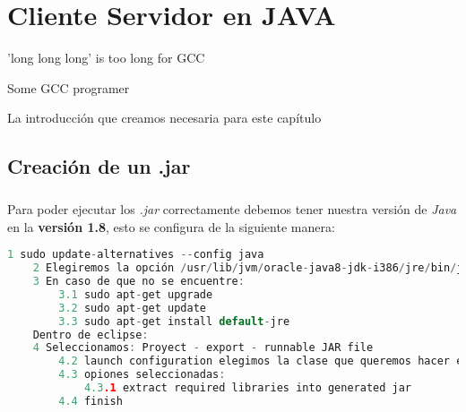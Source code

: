 \newpage

\thispagestyle{empty}
\mbox{}

\chapter{Cliente Servidor en JAVA}

\label{ch:capitulo6.tex}

\begin{FraseCelebre}
	\begin{Frase}
		'long long long' is too long for GCC
	\end{Frase}
	\begin{Fuente}
	Some GCC programer
	\end{Fuente}
\end{FraseCelebre}

La introducción que creamos necesaria para este capítulo

\section{Creación de un .jar}
\label{makereference6.2}
\paragraph{}

Para poder ejecutar los \textit{.jar} correctamente debemos tener nuestra versión de \textit{Java} en la \textbf{versión 1.8}, esto se configura de la siguiente manera:

\begin{lstlisting}[language=c,frame=single,numbers=none]
	1 sudo update-alternatives --config java
	2 Elegiremos la opción /usr/lib/jvm/oracle-java8-jdk-i386/jre/bin/java
	3 En caso de que no se encuentre:
		3.1	sudo apt-get upgrade
		3.2	sudo apt-get update
		3.3	sudo apt-get install default-jre
	Dentro de eclipse:
	4 Seleccionamos: Proyect - export - runnable JAR file
		4.2	launch configuration elegimos la clase que queremos hacer ejecutable (client.java o server.java)
		4.3 opiones seleccionadas: 
        	4.3.1 extract required libraries into generated jar
		4.4 finish
    
\end{lstlisting}


	
	 


